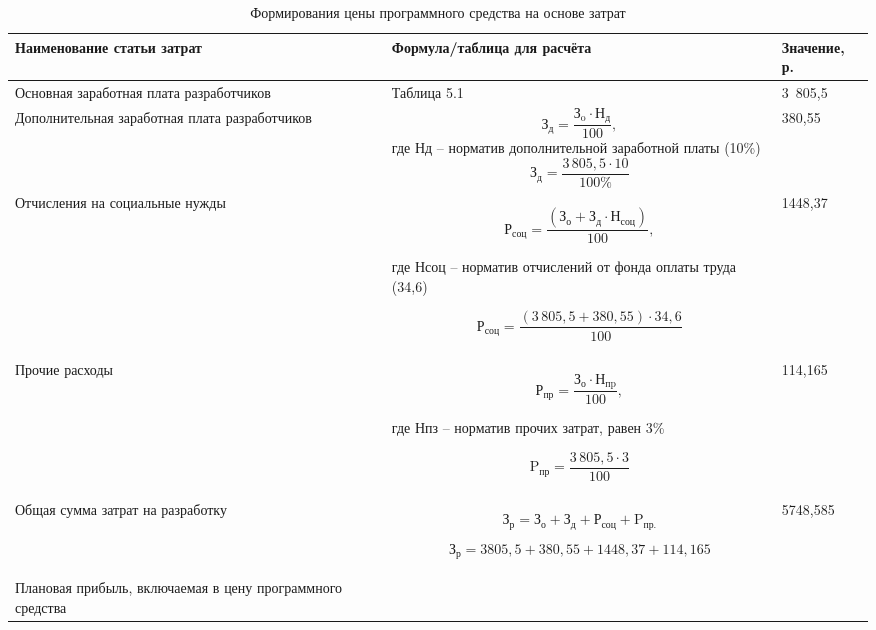 \begin{table}[H]
	\caption{Формирования цены программного средства на основе затрат}
	\centering 
	\begin{tabular}{|p{5cm}|p{7cm}|p{3cm}|}
		\hline 
		Наименование статьи затрат  & Формула/таблица для расчёта & Значение, р. \\ 
		\hline  
		Основная заработная плата разработчиков & Таблица 5.1  & 3 805,5 \\
		\hline  
		Дополнительная заработная плата разработчиков  &
		
		\begin{equation}
			{\text{З}}_{\text{д}} = \frac{{\text{З}}_{\text{o}} \cdot {\text{Н}}_{\text{д}}}{100},
		\end{equation}
		где	Нд – норматив дополнительной заработной платы (10\%)
		\[{\text{З}}_{\text{д}} = \frac{3\,805{,}5 \cdot 10}{100\%} \]
		
		
		    & 380,55 \\ 
		\hline   
		Отчисления на социальные нужды	 & 
		
		\begin{equation}
				\mathrm{Р_{соц}} = \frac{(\mathrm{З_{о}} + \mathrm{З_{д}} \cdot \mathrm{Н_{соц}})}{100},
		\end{equation}
		
		где Нсоц – норматив отчислений от фонда оплаты труда (34,6)
		
			\[	\text{Р}_{\text{соц}} = \frac{(3\,805{,}5 + 380{,}55) \cdot 34{,}6}{100} \]
		
		
		  & 1448,37  \\ 
		\hline   
		Прочие расходы	& 
		
		\begin{equation}
			\text{Р}_{\text{пр}} = \frac{\text{З}_\text{о} \cdot \text{Н}_{\text{пp}}}{100},
			\label{eq:pnp}
		\end{equation}
		
		где Нпз – норматив прочих затрат, равен 3\%
		
		\[	\mathrm{P_{пр}} = \frac{3\,805,5 \cdot 3}{100} \]
		
		 &  114,165 \\ 
		\hline  
		Общая сумма затрат на разработку & 
			\begin{equation}
				\mathrm{З_{р}}  = \mathrm{З_{о}}  + \mathrm{З_{д}}  + \mathrm{Р_{соц}}  + \mathrm{P_{пр.}} 
			\end{equation}
		
		\[	\mathrm{З_{р}} = {{3805,5}} + {{380,55}} + {{1448,37}}  + {{114,165}} \]
		 & 5748,585  \\
		\hline 
		Плановая прибыль, включаемая в
		цену программного средства  & 
		

\end{tabular}
\end{table}
